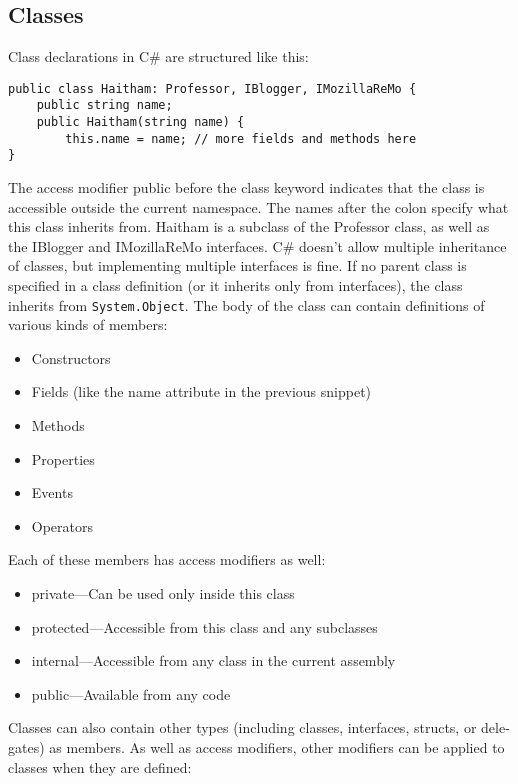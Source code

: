 \documentclass[12pt,a4paper,final,twoside,onecolumn,titlepage]{book}
\begin{document}
\subsection{Classes}
Class declarations in C\# are structured like this:
\lstset{language=csh, tabsize=4}
 \begin{lstlisting}
public class Haitham: Professor, IBlogger, IMozillaReMo { 
	public string name; 
	public Haitham(string name) {
		this.name = name; // more fields and methods here
}
\end{lstlisting}
The access modifier public before the class keyword indicates that the class is accessible outside the current namespace. The names after the colon specify what this class inherits from. Haitham is a subclass of the Professor class, as well as the IBlogger and IMozillaReMo interfaces. C\# doesn’t allow multiple inheritance of classes, but implementing multiple interfaces is fine. If no parent class is specified in a class definition (or it inherits only from interfaces), the class inherits from \texttt{System.Object}. The body of the class can contain definitions of various kinds of members:
\begin{itemize}
\item Constructors 
\item Fields (like the name attribute in the previous snippet) 
\item Methods 
\item Properties 
\item Events 
\item Operators
\end{itemize}
Each of these members has access modifiers as well:
\begin{itemize}
\item private—Can be used only inside this class 
\item protected—Accessible from this class and any subclasses 
\item internal—Accessible from any class in the current assembly 
\item public—Available from any code
\end{itemize}
Classes can also contain other types (including classes, interfaces, structs, or dele- gates) as members.
As well as access modifiers, other modifiers can be applied to classes when they are defined:
\end{document}
